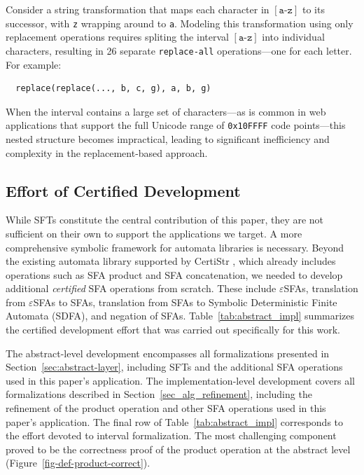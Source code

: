 Consider a string transformation that maps each character in $[\texttt{a-z}]$ to its successor, with \texttt{z} wrapping around to \texttt{a}. Modeling this transformation using only replacement operations requires spliting the interval $[\texttt{a-z}]$ into individual characters, resulting in 26 separate \texttt{replace-all} operations—one for each letter. For example:
\begin{verbatim}
  replace(replace(..., b, c, g), a, b, g)
\end{verbatim}


When the interval contains a large set of characters—as is common in web applications that support the full Unicode range of 
\texttt{0x10FFFF} code points—this nested structure becomes impractical, leading to significant inefficiency and complexity in the replacement-based approach.






\subsection{Effort of Certified Development}

While SFTs constitute the central contribution of this paper, they are not sufficient on their own to support the applications we target. A more comprehensive symbolic framework for automata libraries is necessary. Beyond the existing automata library supported by CertiStr \cite{cpp/KanLRS22}, which already includes operations such as SFA product and SFA concatenation, we needed to develop additional \emph{certified} SFA operations from scratch. These include $\varepsilon$SFAs, translation from $\varepsilon$SFAs to SFAs, translation from SFAs to Symbolic Deterministic Finite Automata (SDFA), and negation of SFAs. Table~\ref{tab:abstract_impl} summarizes the certified development effort that was carried out specifically for this work.

The abstract-level development encompasses all formalizations presented in Section~\ref{sec:abstract-layer}, including SFTs and the additional SFA operations used in this paper's application. The implementation-level development covers all formalizations described in Section~\ref{sec_alg_refinement}, including the refinement of the product operation and other SFA operations used in this paper's application. The final row of Table~\ref{tab:abstract_impl} corresponds to the effort devoted to interval formalization. The most challenging component proved to be the correctness proof of the product operation at the abstract level (Figure~\ref{fig-def-product-correct}).
%


